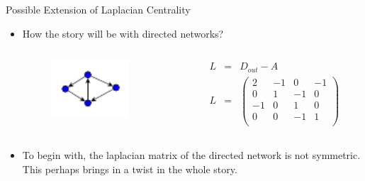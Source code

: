 \documentclass{beamer}
\begin{document}
\begin{frame}{Possible Extension of Laplacian Centrality}
	\begin{itemize}
		\item How the story will be with directed networks?
		 \begin{columns}
				\begin{column}{0.5\textwidth}
					\begin{center}
						\begin{figure}
					\includegraphics[width=0.85\textwidth]{images/directed-graph.pdf}
					\end{figure}
					\end{center}
				\end{column}
				\begin{column}{0.45\textwidth}  
				\begin{eqnarray*}
				L &=& D_{out} - A \\
				 L &=& \begin{pmatrix}
				 2 & -1& 0& -1 \\
				  0 & 1& -1 & 0 \\
				   -1 & 0& 1 & 0 \\
				    0 & 0& -1 & 1 \\
				 \end{pmatrix}
				\end{eqnarray*}
				\end{column}
			\end{columns}
		\item To begin with, the laplacian matrix of the directed network is not symmetric. This perhaps brings in a twist in the whole story.
	\end{itemize}
	
\end{frame}
\end{document}
